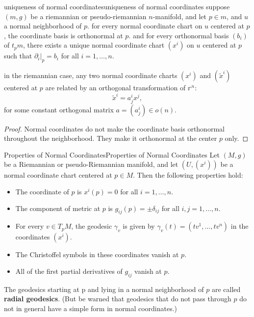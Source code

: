 \documentclass[../main.tex]{subfiles}
\begin{document}
\begin{proposition}{uniqueness of normal coordinates}{uniqueness of normal coordinates}
	suppose $(m, g)$ be a riemannian or pseudo-riemannian $n$-manifold, and let $p \in m$, and $u$ a normal neighborhood of $p$. for every normal coordinate chart on $u$ centered at $p$, the coordinate basis is orthonormal at $p$. and for every orthonormal basis $(b_i)$ of $t_p m$, there exists a unique normal coordinate chart $(x^i)$ on $u$ centered at $p$ such that $\partial_i|_p = b_i$ for all $i = 1, \ldots, n$.

	in the riemannian case, any two normal coordinate charts $(x^i)$ and $(\tilde{x}^i)$ centered at $p$ are related by an orthogonal transformation of $\mathbb{r}^n$:
	\begin{equation}
		\tilde{x}^i = a^i_j x^j,
	\end{equation}
	for some constant orthogonal matrix $a = (a^i_j) \in o(n)$.
\end{proposition}
\begin{proof}
	Normal coordinates do not make the coordinate basis orthonormal throughout the neighborhood. They make it orthonormal at the center $p$ only.
\end{proof}

\begin{proposition}{Properties of Normal Coordinates}{Properties of Normal Coordinates}
	Let $(M, g)$ be a Riemannian or pseudo-Riemannian manifold, and let $(U, (x^i))$ be a normal coordinate chart centered at $p \in M$. Then the following properties hold:
	\begin{itemize}
		\item The coordinate of $p$ is $x^i(p) = 0$ for all $i = 1, \ldots, n$.
		\item The component of metric at $p$ is $g_{ij}(p) = \pm \delta_{ij}$ for all $i, j = 1, \ldots, n$.
		\item For every $v \in T_p M$, the geodesic $\gamma_v$ is given by $\gamma_v(t) = (t v^1, \ldots, t v^n)$ in the coordinates $(x^i)$.
		\item The Christoffel symbols in these coordinates vanish at $p$.
		\item All of the first partial derivatives of $g_{ij}$ vanish at $p$.
	\end{itemize}
\end{proposition}

The geodesics starting at p and lying in a normal neighborhood of $p$ are called \textbf{radial geodesics}. (But be warned that geodesics that do not pass through $p$ do not in general have a simple form in normal coordinates.)
\end{document}
